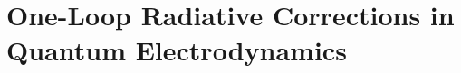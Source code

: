 \section[One-Loop Radiative Corrections in Quantum Electrodynamics]{\texorpdfstring{One-Loop Radiative Corrections in\\Quantum Electrodynamics}{One-Loop Radiative Corrections in Quantum Electrodynamics}}







